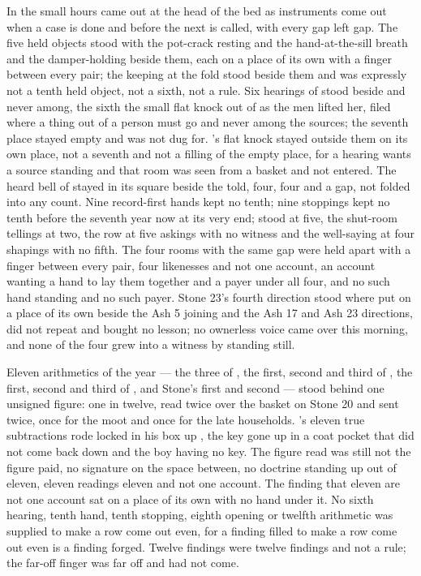 \scenebreak

In the small hours  came out at the head of the bed as instruments come out when a case is done and before the next is called, with every gap left gap. The five held objects stood with the pot-crack resting and the hand-at-the-sill breath and the damper-holding beside them, each on a place of its own with a finger between every pair; the keeping at the fold stood beside them and was expressly not a tenth held object, not a sixth, not a rule. Six hearings of  stood beside and never among, the sixth the small flat knock out of  as the men lifted her, filed where a thing out of a person must go and never among the sources; the seventh place stayed empty and was not dug for. 's flat knock stayed outside them on its own place, not a seventh and not a filling of the empty place, for a hearing wants a source standing and that room was seen from a basket and not entered. The heard bell of  stayed in its square beside the told, four, four and a gap, not folded into any count. Nine record-first hands kept no tenth; nine stoppings kept no tenth before the seventh year now at its very end;  stood at five, the shut-room tellings at two, the row at five askings with no witness and the well-saying at four shapings with no fifth. The four rooms with the same gap were held apart with a finger between every pair, four likenesses and not one account, an account wanting a hand to lay them together and a payer under all four, and no such hand standing and no such payer. Stone 23's fourth direction stood where put on a place of its own beside the Ash 5 joining and the Ash 17 and Ash 23 directions, did not repeat and bought no lesson; no ownerless voice came over  this morning, and none of the four grew into a witness by standing still.

Eleven arithmetics of the year --- the three of , the first, second and third of , the first, second and third of , and Stone's first and second --- stood behind one unsigned figure: one in twelve, read twice over the basket on Stone 20 and sent twice, once for the moot and once for the late households. 's eleven true subtractions rode locked in his box up , the key gone up in a coat pocket that did not come back down and the boy having no key. The figure read was still not the figure paid, no signature on the space between, no doctrine standing up out of eleven, eleven readings eleven and not one account. The finding that eleven are not one account sat on a place of its own with no hand under it. No sixth hearing, tenth hand, tenth stopping, eighth opening or twelfth arithmetic was supplied to make a row come out even, for a finding filled to make a row come out even is a finding forged. Twelve findings were twelve findings and not a rule; the far-off finger was far off and had not come.


